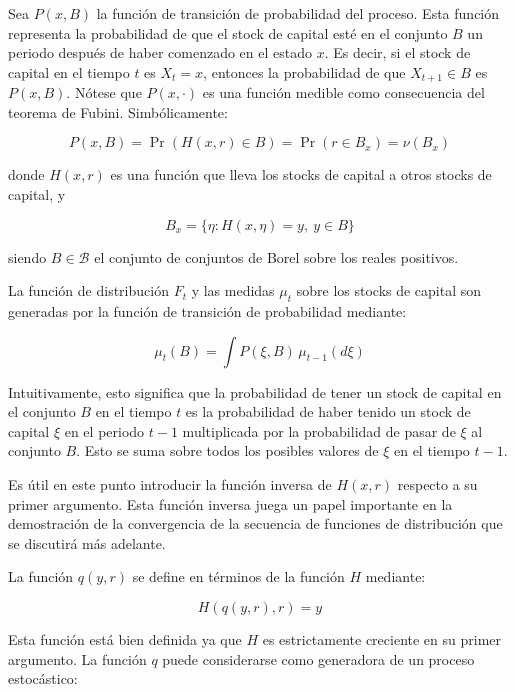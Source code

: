 \documentclass[a4paper,12pt]{article}
\begin{document}
Sea $P(x, B)$ la función de transición de probabilidad del proceso. Esta función representa la probabilidad de que el stock de capital esté en el conjunto $B$ un periodo después de haber comenzado en el estado $x$. Es decir, si el stock de capital en el tiempo $t$ es $X_t = x$, entonces la probabilidad de que $X_{t+1} \in B$ es $P(x, B)$. Nótese que $P(x, \cdot)$ es una función medible como consecuencia del teorema de Fubini. Simbólicamente:

		\begin{equation}
P(x, B) = \Pr(H(x, r) \in B) = \Pr(r \in B_x) = \nu(B_x)
		\end{equation}

donde $H(x, r)$ es una función que lleva los stocks de capital a otros stocks de capital, y

		\begin{equation}
B_x = \{ \eta : H(x, \eta) = y,\ y \in B \}
		\end{equation}

siendo \( B \in \mathcal{B} \) el conjunto de conjuntos de Borel sobre los reales positivos.

La función de distribución $F_t$ y las medidas $\mu_t$ sobre los stocks de capital son generadas por la función de transición de probabilidad mediante:

		\begin{equation}
\mu_t(B) = \int P(\xi, B) \, \mu_{t-1}(d\xi)
		\end{equation}

Intuitivamente, esto significa que la probabilidad de tener un stock de capital en el conjunto $B$ en el tiempo $t$ es la probabilidad de haber tenido un stock de capital $\xi$ en el periodo $t-1$ multiplicada por la probabilidad de pasar de $\xi$ al conjunto $B$. Esto se suma sobre todos los posibles valores de $\xi$ en el tiempo $t-1$.

Es útil en este punto introducir la función inversa de $H(x, r)$ respecto a su primer argumento. Esta función inversa juega un papel importante en la demostración de la convergencia de la secuencia de funciones de distribución que se discutirá más adelante.

La función $q(y, r)$ se define en términos de la función $H$ mediante:

		\begin{equation}
H(q(y, r), r) = y
		\end{equation}

Esta función está bien definida ya que $H$ es estrictamente creciente en su primer argumento. La función $q$ puede considerarse como generadora de un proceso estocástico:
\end{document}
